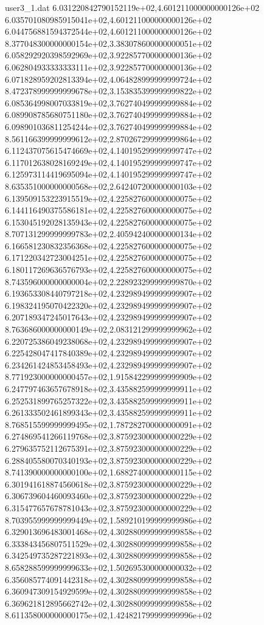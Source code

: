 \begin{filecontents}{user3_1.dat}
6.031220842790152119e+02,4.601211000000000126e+02
6.035701080985915041e+02,4.601211000000000126e+02
6.044756881594372544e+02,4.601211000000000126e+02
8.377048300000000154e+02,3.383078600000000051e+02
6.058292920398592969e+02,3.922857700000000136e+02
6.062804933333333111e+02,3.922857700000000136e+02
6.071828959202813394e+02,4.064828999999999724e+02
8.472378999999999678e+02,3.153835399999999822e+02
6.085364998007033819e+02,3.762740499999999884e+02
6.089908785680751180e+02,3.762740499999999884e+02
6.098901036811254244e+02,3.762740499999999884e+02
8.561166399999999612e+02,2.870267299999999864e+02
6.112437075615474669e+02,4.140195299999999747e+02
6.117012638028169249e+02,4.140195299999999747e+02
6.125973114419695094e+02,4.140195299999999747e+02
8.635351000000000568e+02,2.642407200000000103e+02
6.139509153223915519e+02,4.225827600000000075e+02
6.144116490375586181e+02,4.225827600000000075e+02
6.153045192028135943e+02,4.225827600000000075e+02
8.707131299999999783e+02,2.405942400000000134e+02
6.166581230832356368e+02,4.225827600000000075e+02
6.171220342723004251e+02,4.225827600000000075e+02
6.180117269636576793e+02,4.225827600000000075e+02
8.743596000000000004e+02,2.228923299999999870e+02
6.193653308440797218e+02,4.232989499999999907e+02
6.198324195070422320e+02,4.232989499999999907e+02
6.207189347245017643e+02,4.232989499999999907e+02
8.763686000000000149e+02,2.083121299999999962e+02
6.220725386049238068e+02,4.232989499999999907e+02
6.225428047417840389e+02,4.232989499999999907e+02
6.234261424853458493e+02,4.232989499999999907e+02
8.771923000000000457e+02,1.915842299999999909e+02
6.247797463657678918e+02,3.435882599999999911e+02
6.252531899765257322e+02,3.435882599999999911e+02
6.261333502461899343e+02,3.435882599999999911e+02
8.768515599999999495e+02,1.787282700000000091e+02
6.274869541266119768e+02,3.875923000000000229e+02
6.279635752112675391e+02,3.875923000000000229e+02
6.288405580070340193e+02,3.875923000000000229e+02
8.741390000000000100e+02,1.688274000000000115e+02
6.301941618874560618e+02,3.875923000000000229e+02
6.306739604460093460e+02,3.875923000000000229e+02
6.315477657678781043e+02,3.875923000000000229e+02
8.703955999999999449e+02,1.589210199999999986e+02
6.329013696483001468e+02,4.302880999999999858e+02
6.333843456807511529e+02,4.302880999999999858e+02
6.342549735287221893e+02,4.302880999999999858e+02
8.658288599999999633e+02,1.502695300000000032e+02
6.356085774091442318e+02,4.302880999999999858e+02
6.360947309154929599e+02,4.302880999999999858e+02
6.369621812895662742e+02,4.302880999999999858e+02
8.611358000000000175e+02,1.424821799999999996e+02

\end{filecontents}
